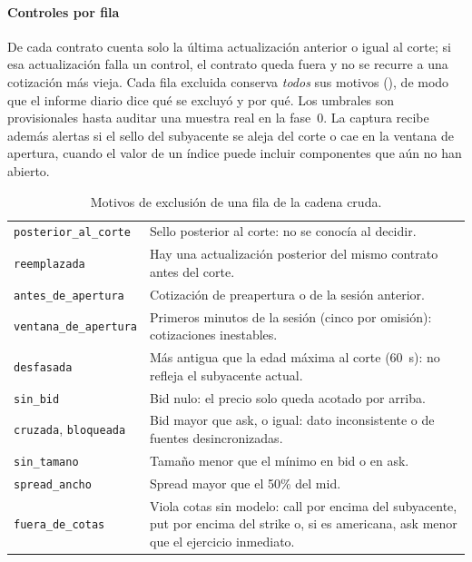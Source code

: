 \paragraph{Controles por fila} De cada contrato cuenta solo la última actualización anterior o igual al
corte; si esa actualización falla un control, el contrato queda fuera y no se recurre a una cotización más
vieja. Cada fila excluida conserva \emph{todos} sus motivos (), de modo que el informe
diario dice qué se excluyó y por qué. Los umbrales son provisionales hasta auditar una muestra real en la
fase~0. La captura recibe además alertas si el sello del subyacente se aleja del corte o cae en la
ventana de apertura, cuando el valor de un índice puede incluir componentes que aún no han abierto.

\begin{table}[H]
\centering\small
\caption{Motivos de exclusión de una fila de la cadena cruda.}
\label{tab:motivos}
\begin{tabularx}{\linewidth}{@{}l Y@{}}
\toprule
{} & \\
\midrule
\texttt{posterior\_al\_corte} & Sello posterior al corte: no se conocía al decidir.\\
\texttt{reemplazada} & Hay una actualización posterior del mismo contrato antes del corte.\\
\texttt{antes\_de\_apertura} & Cotización de preapertura o de la sesión anterior.\\
\texttt{ventana\_de\_apertura} & Primeros minutos de la sesión (cinco por omisión): cotizaciones inestables.\\
\texttt{desfasada} & Más antigua que la edad máxima al corte (60~s): no refleja el subyacente actual.\\
\texttt{sin\_bid} & Bid nulo: el precio solo queda acotado por arriba.\\
\texttt{cruzada}, \texttt{bloqueada} & Bid mayor que ask, o igual: dato inconsistente o de fuentes
desincronizadas.\\
\texttt{sin\_tamano} & Tamaño menor que el mínimo en bid o en ask.\\
\texttt{spread\_ancho} & Spread mayor que el 50\% del mid.\\
\texttt{fuera\_de\_cotas} & Viola cotas sin modelo: call por encima del subyacente, put por encima del
strike o, si es americana, ask menor que el ejercicio inmediato.\\
\bottomrule
\end{tabularx}
\end{table}

